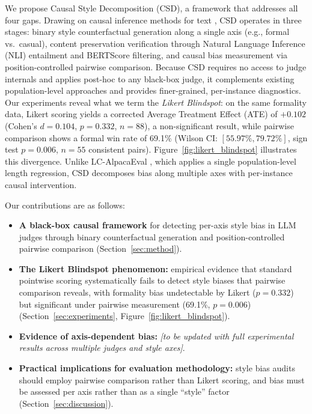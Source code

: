 We propose Causal Style Decomposition (CSD), a framework that addresses all four gaps.
Drawing on causal inference methods for text \citep{veitch2020adapting}, CSD operates in three stages: binary style counterfactual generation along a single axis (e.g., formal vs.\ casual), content preservation verification through Natural Language Inference (NLI) entailment and BERTScore filtering, and causal bias measurement via position-controlled pairwise comparison.
Because CSD requires no access to judge internals and applies post-hoc to any black-box judge, it complements existing population-level approaches and provides finer-grained, per-instance diagnostics.
Our experiments reveal what we term the \emph{Likert Blindspot}: on the same formality data, Likert scoring yields a corrected Average Treatment Effect (ATE) of $+0.102$ (Cohen's $d = 0.104$, $p = 0.332$, $n = 88$), a non-significant result, while pairwise comparison shows a formal win rate of 69.1\% (Wilson CI: $[55.97\%, 79.72\%]$, sign test $p = 0.006$, $n = 55$ consistent pairs).
Figure~\ref{fig:likert_blindspot} illustrates this divergence.
Unlike LC-AlpacaEval \citep{dubois2025lc}, which applies a single population-level length regression, CSD decomposes bias along multiple axes with per-instance causal intervention.

Our contributions are as follows:
\begin{itemize}
    \item \textbf{A black-box causal framework} for detecting per-axis style bias in LLM judges through binary counterfactual generation and position-controlled pairwise comparison (Section~\ref{sec:method}).
    \item \textbf{The Likert Blindspot phenomenon:} empirical evidence that standard pointwise scoring systematically fails to detect style biases that pairwise comparison reveals, with formality bias undetectable by Likert ($p = 0.332$) but significant under pairwise measurement (69.1\%, $p = 0.006$) (Section~\ref{sec:experiments}, Figure~\ref{fig:likert_blindspot}).
    \item \textbf{Evidence of axis-dependent bias:} \textit{[to be updated with full experimental results across multiple judges and style axes]}.
    \item \textbf{Practical implications for evaluation methodology:} style bias audits should employ pairwise comparison rather than Likert scoring, and bias must be assessed per axis rather than as a single ``style'' factor (Section~\ref{sec:discussion}).
\end{itemize}
